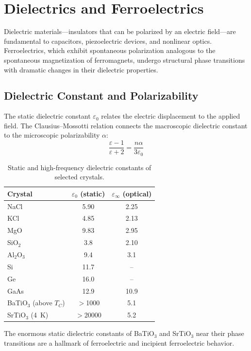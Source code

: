 \chapter{Dielectrics and Ferroelectrics}

Dielectric materials---insulators that can be polarized by an electric field---are fundamental to capacitors, piezoelectric devices, and nonlinear optics. Ferroelectrics, which exhibit spontaneous polarization analogous to the spontaneous magnetization of ferromagnets, undergo structural phase transitions with dramatic changes in their dielectric properties.

\section{Dielectric Constant and Polarizability}

The static dielectric constant $\varepsilon_0$ relates the electric displacement to the applied field. The Clausius--Mossotti relation connects the macroscopic dielectric constant to the microscopic polarizability $\alpha$:
\begin{equation}
  \frac{\varepsilon - 1}{\varepsilon + 2} = \frac{n\alpha}{3\varepsilon_0}
\end{equation}

\begin{table}[H]
\centering
\caption{Static and high-frequency dielectric constants of selected crystals.}
\label{tab:dielectric}
\begin{tabular}{@{}lSS@{}}
\toprule
Crystal & {$\varepsilon_0$ (static)} & {$\varepsilon_\infty$ (optical)} \\
\midrule
NaCl    & 5.90  & 2.25 \\
KCl     & 4.85  & 2.13 \\
MgO     & 9.83  & 2.95 \\
SiO$_2$ & 3.8   & 2.10 \\
Al$_2$O$_3$ & 9.4 & 3.1 \\
Si      & 11.7  & {--} \\
Ge      & 16.0  & {--} \\
GaAs    & 12.9  & 10.9 \\
\midrule
BaTiO$_3$ (above $T_C$) & {$>$1000} & 5.1 \\
SrTiO$_3$ (\SI{4}{\kelvin}) & {$>$20000} & 5.2 \\
\bottomrule
\end{tabular}
\end{table}

The enormous static dielectric constants of BaTiO$_3$ and SrTiO$_3$ near their phase transitions are a hallmark of ferroelectric and incipient ferroelectric behavior.



